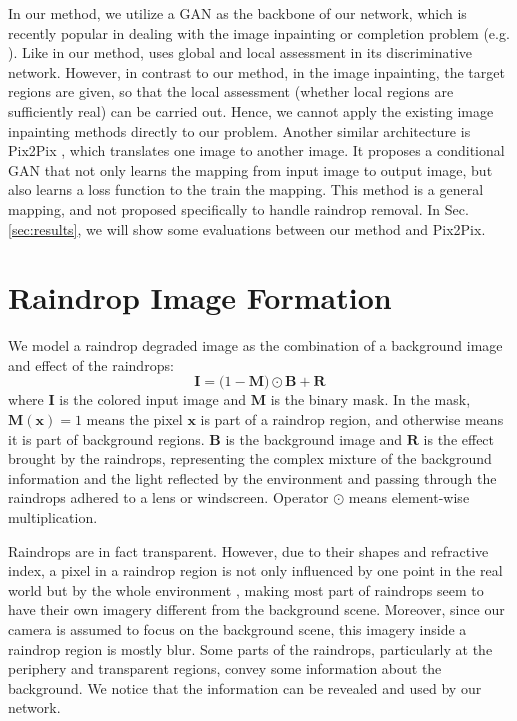 \documentclass[10pt,twocolumn,letterpaper]{article}
\begin{document}
In our method, we utilize a GAN \cite{goodfellow2014generative} as the backbone of our network, which is recently popular in dealing with the image inpainting or completion problem (e.g. \cite{iizuka2017globally,li2017generative}). Like in our method, \cite{iizuka2017globally} uses global and local assessment in its discriminative network. However, in contrast to our method, in the image inpainting, the target regions are given, so that the local assessment (whether local regions are sufficiently real) can be carried out. Hence, we cannot apply the existing image inpainting methods directly to our problem. Another similar architecture is Pix2Pix \cite{isola2016image}, which translates one image to another image.  It proposes a conditional GAN that not only learns the mapping from input image to output image, but also learns a loss function to the train the mapping. This method is a general mapping, and not proposed specifically to handle raindrop removal. In Sec. \ref{sec:results}, we will show some evaluations between our method and Pix2Pix.

\section{Raindrop Image Formation}
\label{sec:image_formation}

We model a raindrop degraded image as the combination of a background image and effect of the raindrops:
\begin{equation}
\mathbf{I} = \mathbf(1 - \mathbf{M})\odot\mathbf{B} + \mathbf{R} 
\label{eq:model}
\end{equation}
where $\mathbf{I}$ is the colored input image and $\mathbf{M}$ is the binary mask. In the mask, $\mathbf{M}(\mathbf{x}) = 1$ means the pixel $\mathbf{x}$ is part of a raindrop region, and otherwise means it is part of background regions. $\mathbf{B}$ is the background image and $\mathbf{R}$ is the effect brought by the raindrops, representing the complex mixture of the background information and the light reflected by the environment  and passing through the raindrops adhered to a lens or windscreen. Operator $\odot$ means element-wise multiplication.


Raindrops are in fact transparent. However, due to their shapes and refractive index, a pixel in a raindrop region is not only influenced by one point in the real world but by the whole environment \cite{you2016adherent}, making most part of raindrops seem to have their own imagery different from the background scene. Moreover, since our camera is assumed to focus on the background scene, this imagery inside a raindrop region is mostly blur. Some parts of the raindrops, particularly at the periphery and transparent regions, convey some information about the background. We notice that the information can be revealed and used by our network.
\end{document}

